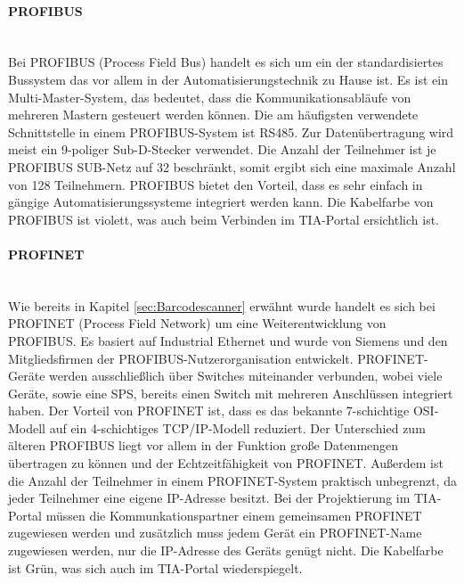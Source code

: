 \paragraph{PROFIBUS \cite{Profibus}}\mbox{}\\
Bei PROFIBUS (Process Field Bus) handelt es sich um ein der standardisiertes Bussystem das vor allem in der Automatisierungstechnik zu Hause ist. Es ist ein Multi-Master-System, das bedeutet, dass die Kommunikationsabläufe von mehreren Mastern gesteuert werden können. Die am häufigsten verwendete Schnittstelle in einem PROFIBUS-System ist RS485. Zur Datenübertragung wird meist ein 9-poliger Sub-D-Stecker verwendet. Die Anzahl der Teilnehmer ist je PROFIBUS SUB-Netz auf 32 beschränkt, somit ergibt sich eine maximale Anzahl von 128 Teilnehmern. PROFIBUS bietet den Vorteil, dass es sehr einfach in gängige Automatisierungssysteme integriert werden kann. Die Kabelfarbe von PROFIBUS ist violett, was auch beim Verbinden im TIA-Portal ersichtlich ist.

\paragraph{PROFINET \cite{Profinet}}\mbox{}\\
Wie bereits in Kapitel \ref{sec:Barcodescanner} erwähnt wurde handelt es sich bei PROFINET (Process Field Network) um eine Weiterentwicklung von PROFIBUS. Es basiert auf Industrial Ethernet und wurde von Siemens und den Mitgliedsfirmen der PROFIBUS-Nutzerorganisation entwickelt. PROFINET-Geräte werden ausschließlich über Switches miteinander verbunden, wobei viele Geräte, sowie eine SPS, bereits einen Switch mit mehreren Anschlüssen integriert haben. Der Vorteil von PROFINET ist, dass es das bekannte 7-schichtige OSI-Modell auf ein 4-schichtiges TCP/IP-Modell reduziert. Der Unterschied zum älteren PROFIBUS liegt vor allem in der Funktion große Datenmengen übertragen zu können und der Echtzeitfähigkeit von PROFINET. Außerdem ist die Anzahl der Teilnehmer in einem PROFINET-System praktisch unbegrenzt, da jeder Teilnehmer eine eigene IP-Adresse besitzt. Bei der Projektierung im TIA-Portal müssen die Kommunkationspartner einem gemeinsamen PROFINET zugewiesen werden und zusätzlich muss jedem Gerät ein PROFINET-Name zugewiesen werden, nur die IP-Adresse des Geräts genügt nicht. Die Kabelfarbe ist Grün, was sich auch im TIA-Portal wiederspiegelt.

